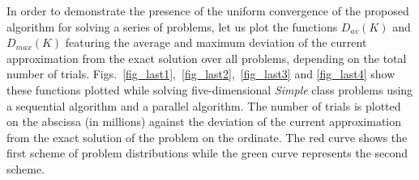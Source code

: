 \documentclass[smallcondensed]{svjour3}     %
\begin{document}
In order to demonstrate the presence of the uniform convergence of the proposed algorithm for solving a series of problems, let us plot the functions $D_{av}(K)$ and $D_{max}(K)$ featuring the average and maximum deviation of the current approximation from the exact solution over all problems, depending on the total number of trials. 
Figs.~\ref{fig_last1},~\ref{fig_last2},~\ref{fig_last3} and \ref{fig_last4} show these functions plotted while solving five-dimensional \textit{Simple} class problems using a sequential algorithm and a parallel algorithm.
The number of trials is plotted on the abscissa (in millions) against the deviation of the current approximation from the exact solution of the problem on the ordinate. The red curve shows the first scheme of problem distributions while the green curve represents the second scheme. 
\end{document}
